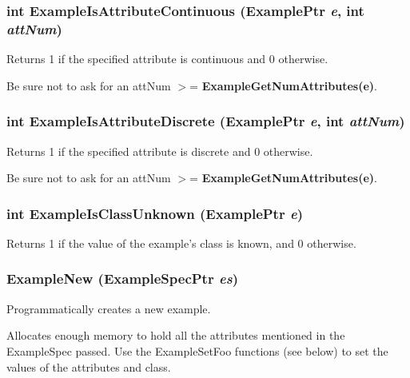 \subsubsection{\setlength{\rightskip}{0pt plus 5cm}int Example\-Is\-Attribute\-Continuous ({\bf Example\-Ptr} {\em e}, int {\em att\-Num})}\label{Example_8h_a21}


Returns 1 if the specified attribute is continuous and 0 otherwise. 

Be sure not to ask for an att\-Num $>$= {\bf Example\-Get\-Num\-Attributes(e)}. 
\subsubsection{\setlength{\rightskip}{0pt plus 5cm}int Example\-Is\-Attribute\-Discrete ({\bf Example\-Ptr} {\em e}, int {\em att\-Num})}\label{Example_8h_a20}


Returns 1 if the specified attribute is discrete and 0 otherwise. 

Be sure not to ask for an att\-Num $>$= {\bf Example\-Get\-Num\-Attributes(e)}. 
\subsubsection{\setlength{\rightskip}{0pt plus 5cm}int Example\-Is\-Class\-Unknown ({\bf Example\-Ptr} {\em e})}\label{Example_8h_a24}


Returns 1 if the value of the example's class is known, and 0 otherwise. 

\subsubsection{ Example\-New ({\bf Example\-Spec\-Ptr} {\em es})}\label{Example_8h_a8}


Programmatically creates a new example. 

Allocates enough memory to hold all the attributes mentioned in the Example\-Spec passed. Use the Example\-Set\-Foo functions (see below) to set the values of the attributes and class.

